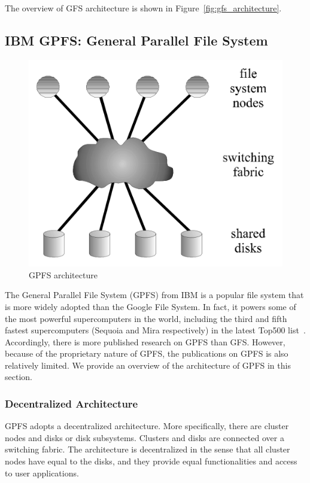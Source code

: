 The overview of GFS architecture is shown in Figure~\ref{fig:gfs_architecture}.



\subsection{IBM GPFS: General Parallel File System}
\label{sec:archi_gpfs}
%
\begin{figure}
\centering
\includegraphics[width=0.95\columnwidth]{image/gpfs_architecture.png}
\caption{GPFS architecture}
\label{fig:gpfs_archi}
\end{figure}
%
The General Parallel File System (GPFS) from IBM is a popular file system
that is more widely adopted than the Google File System. 
%
In fact, it powers some of the most powerful supercomputers in the world,
including the third and fifth fastest supercomputers (Sequoia and Mira 
respectively) in the latest Top500 list~\cite{Strohmaier:2006:TS:1188455.1188474}.
%
Accordingly, there is more published research on GPFS than GFS.
%
However, because of the proprietary nature of GPFS, the publications on 
GPFS is also relatively limited. 
%
We provide an overview of the architecture of GPFS in this section.


\subsubsection{Decentralized Architecture}
GPFS adopts a decentralized architecture.
%
More specifically, there are cluster nodes and disks or disk subsystems.
%
Clusters and disks are connected over a switching fabric.
%
The architecture is decentralized in the sense that all cluster nodes 
have equal to the disks, and they provide equal functionalities and access
to user applications.

